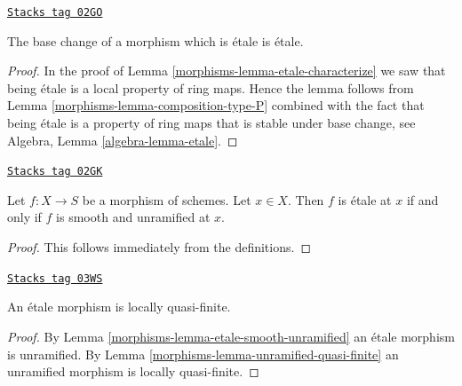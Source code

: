 \begin{lemma}
\label{morphisms-lemma-base-change-etale}
\href{https://stacks.math.columbia.edu/tag/02GO}{\texttt{Stacks tag 02GO}}

The base change of a morphism which is \'etale is \'etale.
\end{lemma}

\begin{proof}

In the proof of Lemma \ref{morphisms-lemma-etale-characterize}
we saw that being \'etale is a local property of ring maps.
Hence the lemma follows from
Lemma \ref{morphisms-lemma-composition-type-P} combined
with the fact that being \'etale is a property of ring maps that is
stable under base change, see
Algebra, Lemma \ref{algebra-lemma-etale}.
\end{proof}

\begin{lemma}
\label{morphisms-lemma-etale-smooth-unramified}
\href{https://stacks.math.columbia.edu/tag/02GK}{\texttt{Stacks tag 02GK}}

Let $f : X \to S$ be a morphism of schemes.
Let $x \in X$. Then $f$ is \'etale at $x$ if and only if $f$ is
smooth and unramified at $x$.
\end{lemma}

\begin{proof}
This follows immediately from the definitions.
\end{proof}

\begin{lemma}
\label{morphisms-lemma-etale-locally-quasi-finite}
\href{https://stacks.math.columbia.edu/tag/03WS}{\texttt{Stacks tag 03WS}}

An \'etale morphism is locally quasi-finite.
\end{lemma}

\begin{proof}

By
Lemma \ref{morphisms-lemma-etale-smooth-unramified}
an \'etale morphism is unramified. By
Lemma \ref{morphisms-lemma-unramified-quasi-finite}
an unramified morphism is locally quasi-finite.
\end{proof}

